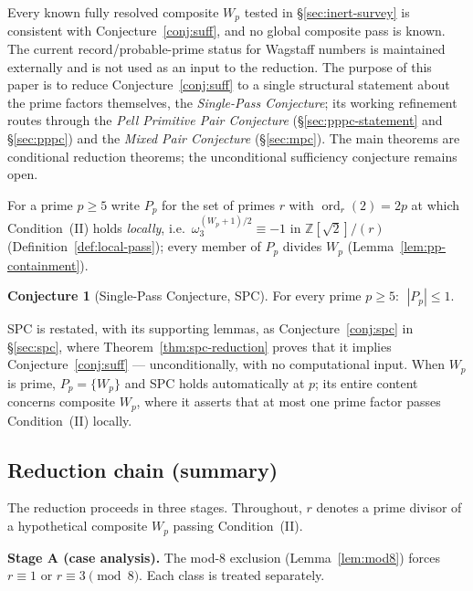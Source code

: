 \documentclass[11pt]{amsart}
\theoremstyle{plain}
\theoremstyle{definition}
\newtheorem{conjecture}[theorem]{Conjecture}
\theoremstyle{remark}
\numberwithin{equation}{section}
\newcommand{\ord}{\operatorname{ord}}
\newcommand{\Z}{\mathbb{Z}}
\begin{document}
Every known fully resolved composite $W_p$ tested in \S\ref{sec:inert-survey} is consistent with Conjecture~\ref{conj:suff}, and no global composite pass is known. The current record/probable-prime status for Wagstaff numbers is maintained externally \cite{ref:PrimePagesWagstaff} and is not used as an input to the reduction. The purpose of this paper is to reduce Conjecture~\ref{conj:suff} to a single structural statement about the prime factors themselves, the \emph{Single-Pass Conjecture}; its working refinement routes through the \emph{Pell Primitive Pair Conjecture} (\S\ref{sec:pppc-statement} and \S\ref{sec:pppc}) and the \emph{Mixed Pair Conjecture} (\S\ref{sec:mpc}). The main theorems are conditional reduction theorems; the unconditional sufficiency conjecture remains open.

For a prime $p \geq 5$ write $P_p$ for the set of primes $r$ with $\ord_r(2) = 2p$ at which Condition~(II) holds \emph{locally}, i.e.\ $\omega_3^{(W_p+1)/2} \equiv -1$ in $\Z[\sqrt 2]/(r)$ (Definition~\ref{def:local-pass}); every member of $P_p$ divides $W_p$ (Lemma~\ref{lem:pp-containment}).

\begin{conjecture}[Single-Pass Conjecture, SPC]\label{conj:spc-intro}
For every prime $p \geq 5$: $\;|P_p| \leq 1$.
\end{conjecture}

SPC is restated, with its supporting lemmas, as Conjecture~\ref{conj:spc} in \S\ref{sec:spc}, where Theorem~\ref{thm:spc-reduction} proves that it implies Conjecture~\ref{conj:suff} --- unconditionally, with no computational input. When $W_p$ is prime, $P_p = \{W_p\}$ and SPC holds automatically at $p$; its entire content concerns composite $W_p$, where it asserts that at most one prime factor passes Condition~(II) locally.

\subsection{Reduction chain (summary)}\label{sec:reduction-chain}

The reduction proceeds in three stages. Throughout, $r$ denotes a prime divisor of a hypothetical composite $W_p$ passing Condition~(II).

\textbf{Stage A (case analysis).} The mod-8 exclusion (Lemma~\ref{lem:mod8}) forces $r \equiv 1$ or $r \equiv 3 \pmod 8$. Each class is treated separately.
\end{document}
